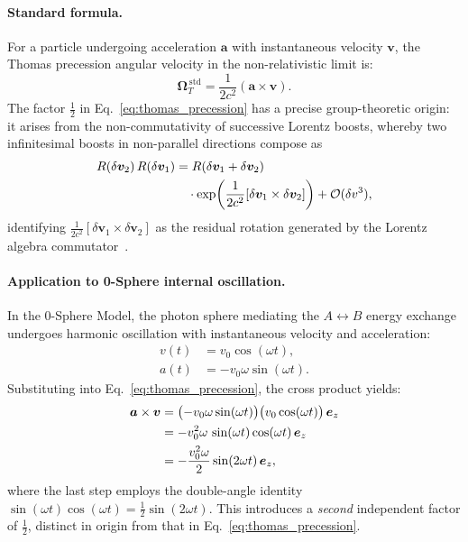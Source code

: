 \documentclass[%
 reprint,
 amsmath,amssymb,
 aps,
 prb,
]{revtex4-2}
\numberwithin{equation}{section}
\theoremstyle{definition}
\theoremstyle{remark}
\begin{document}
\paragraph{Standard formula.}
For a particle undergoing acceleration $\bm{a}$ with instantaneous velocity $\bm{v}$, the Thomas precession angular velocity in the non-relativistic limit is:
\begin{equation}
\bm{\Omega}_T^{\,\text{std}} = \frac{1}{2c^2}(\bm{a} \times \bm{v}).
\label{eq:thomas_precession}
\end{equation}
The factor $\frac{1}{2}$ in Eq.~\eqref{eq:thomas_precession} has a precise group-theoretic origin: it arises from the non-commutativity of successive Lorentz boosts, whereby two infinitesimal boosts in non-parallel directions compose as
\begin{align}
R(\delta\bm{v}_2)\,R(\delta\bm{v}_1)
  &= R(\delta\bm{v}_1 + \delta\bm{v}_2)
  \notag\\
  &\quad\cdot \exp\!\left(\frac{1}{2c^2}[\delta\bm{v}_1 \times \delta\bm{v}_2]\right)
  + \mathcal{O}(\delta v^3),
\label{eq:boost_noncommutativity}
\end{align}
identifying $\frac{1}{2c^2}[\delta\bm{v}_1 \times \delta\bm{v}_2]$ as the residual rotation generated by the Lorentz algebra commutator~\cite{Thomas1926}.

\paragraph{Application to 0-Sphere internal oscillation.}
In the 0-Sphere Model, the photon sphere mediating the $A \leftrightarrow B$ energy exchange undergoes harmonic oscillation with instantaneous velocity and acceleration:
\begin{align}
v(t)   &= v_0\cos(\omega t), \label{eq:v_internal} \\
a(t)   &= -v_0\omega\sin(\omega t). \label{eq:a_internal}
\end{align}
Substituting into Eq.~\eqref{eq:thomas_precession}, the cross product yields:
\begin{align}
\bm{a} \times \bm{v}
&= \bigl(-v_0\omega\sin(\omega t)\bigr)\bigl(v_0\cos(\omega t)\bigr)\,\bm{e}_z \notag \\
&= -v_0^2\omega\,\sin(\omega t)\cos(\omega t)\,\bm{e}_z \notag \\
&= -\frac{v_0^2\omega}{2}\sin(2\omega t)\,\bm{e}_z,
\label{eq:cross_product}
\end{align}
where the last step employs the double-angle identity $\sin(\omega t)\cos(\omega t) = \frac{1}{2}\sin(2\omega t)$. This introduces a \emph{second} independent factor of $\frac{1}{2}$, distinct in origin from that in Eq.~\eqref{eq:thomas_precession}.
\end{document}
